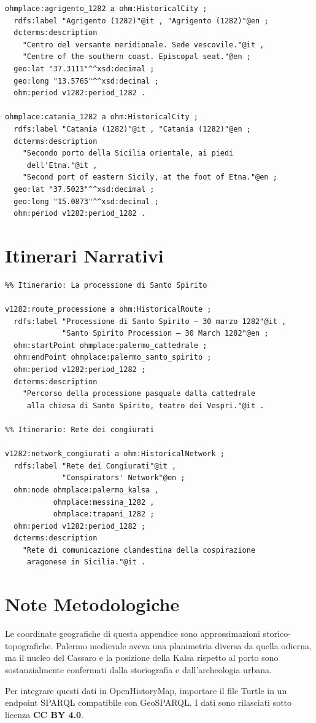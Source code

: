 \begin{verbatim}
ohmplace:agrigento_1282 a ohm:HistoricalCity ;
  rdfs:label "Agrigento (1282)"@it , "Agrigento (1282)"@en ;
  dcterms:description
    "Centro del versante meridionale. Sede vescovile."@it ,
    "Centre of the southern coast. Episcopal seat."@en ;
  geo:lat "37.3111"^^xsd:decimal ;
  geo:long "13.5765"^^xsd:decimal ;
  ohm:period v1282:period_1282 .

ohmplace:catania_1282 a ohm:HistoricalCity ;
  rdfs:label "Catania (1282)"@it , "Catania (1282)"@en ;
  dcterms:description
    "Secondo porto della Sicilia orientale, ai piedi
     dell'Etna."@it ,
    "Second port of eastern Sicily, at the foot of Etna."@en ;
  geo:lat "37.5023"^^xsd:decimal ;
  geo:long "15.0873"^^xsd:decimal ;
  ohm:period v1282:period_1282 .
\end{verbatim}

\section{Itinerari Narrativi}

\begin{verbatim}
%% Itinerario: La processione di Santo Spirito

v1282:route_processione a ohm:HistoricalRoute ;
  rdfs:label "Processione di Santo Spirito — 30 marzo 1282"@it ,
             "Santo Spirito Procession — 30 March 1282"@en ;
  ohm:startPoint ohmplace:palermo_cattedrale ;
  ohm:endPoint ohmplace:palermo_santo_spirito ;
  ohm:period v1282:period_1282 ;
  dcterms:description
    "Percorso della processione pasquale dalla cattedrale
     alla chiesa di Santo Spirito, teatro dei Vespri."@it .

%% Itinerario: Rete dei congiurati

v1282:network_congiurati a ohm:HistoricalNetwork ;
  rdfs:label "Rete dei Congiurati"@it ,
             "Conspirators' Network"@en ;
  ohm:node ohmplace:palermo_kalsa ,
           ohmplace:messina_1282 ,
           ohmplace:trapani_1282 ;
  ohm:period v1282:period_1282 ;
  dcterms:description
    "Rete di comunicazione clandestina della cospirazione
     aragonese in Sicilia."@it .
\end{verbatim}

\section{Note Metodologiche}

Le coordinate geografiche di questa appendice sono approssimazioni
storico-topografiche. Palermo medievale aveva una planimetria
diversa da quella odierna, ma il nucleo del Cassaro e la posizione
della Kalsa rispetto al porto sono sostanzialmente confermati
dalla storiografia e dall'archeologia urbana.

Per integrare questi dati in OpenHistoryMap, importare il file
Turtle in un endpoint SPARQL compatibile con GeoSPARQL.
I dati sono rilasciati sotto licenza \textbf{CC BY 4.0}.

\filettodoppio
